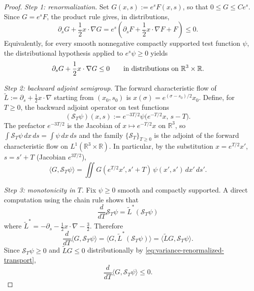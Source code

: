 \documentclass[11pt]{amsart}
\numberwithin{equation}{section}
\theoremstyle{plain}
\theoremstyle{definition}
\theoremstyle{remark}
\begin{document}
\begin{proof}
\emph{Step 1: renormalization.}  Set \(G(x,s):=e^{s}F(x,s)\), so that
\(0\le G\le Ce^{s}\).  Since \(G=e^sF\), the product rule gives, in
distributions,
\[
   \partial_sG+\frac12x\cdot\nabla G
   =
   e^s\left(\partial_sF+\frac12x\cdot\nabla F+F\right)\le0.
\]
Equivalently, for every smooth nonnegative compactly supported test function
\(\psi\), the distributional hypothesis applied to \(e^s\psi\ge0\) yields
\begin{equation}\label{eq:variance-renormalized-transport}
   \partial_sG+\frac12 x\cdot\nabla G\le 0
   \qquad\hbox{in distributions on }\mathbb R^3\times\mathbb R .
\end{equation}

\emph{Step 2: backward adjoint semigroup.}  The forward characteristic flow of
\(\widetilde L:=\partial_s+\frac12 x\cdot\nabla\) starting from \((x_0,s_0)\) is
\(x(\sigma)=e^{(\sigma-s_0)/2}x_0\).  Define, for \(T\ge 0\), the backward
adjoint operator on test functions
\[
   (\mathcal S_T\psi)(x,s)
   :=
   e^{-3T/2}\psi\!\bigl(e^{-T/2}x,\,s-T\bigr) .
\]
The prefactor \(e^{-3T/2}\) is the Jacobian of \(x\mapsto e^{-T/2}x\)
on \(\mathbb R^3\), so \(\int\mathcal S_T\psi\,dx\,ds=\int\psi\,dx\,ds\) and
the family \(\{\mathcal S_T\}_{T\ge 0}\) is the adjoint of the forward
characteristic flow on \(L^1(\mathbb R^3\times\mathbb R)\).  In particular, by
the substitution \(x=e^{T/2}x'\), \(s=s'+T\) (Jacobian \(e^{3T/2}\)),
\begin{equation}\label{eq:variance-pairing-substitution}
   \langle G,\mathcal S_T\psi\rangle
   =\iint G(e^{T/2}x',s'+T)\,\psi(x',s')\,dx'\,ds' .
\end{equation}

\emph{Step 3: monotonicity in \(T\).}  Fix \(\psi\ge 0\) smooth and compactly
supported.  A direct computation using the chain rule shows that
\[
   \frac{d}{dT}\mathcal S_T\psi
   =
   \widetilde L^\ast(\mathcal S_T\psi)
\]
where \(\widetilde L^\ast=-\partial_s-\frac12 x\cdot\nabla-\frac32\).
Therefore
\[
   \frac{d}{dT}\langle G,\mathcal S_T\psi\rangle
   =\langle G,\widetilde L^\ast(\mathcal S_T\psi)\rangle
   =\langle \widetilde L G,\mathcal S_T\psi\rangle .
\]
Since \(\mathcal S_T\psi\ge 0\) and \(\widetilde L G\le 0\) distributionally by
\eqref{eq:variance-renormalized-transport},
\begin{equation}\label{eq:variance-monotone}
   \frac{d}{dT}\langle G,\mathcal S_T\psi\rangle\le 0 .
\end{equation}


\end{proof}
\end{document}
